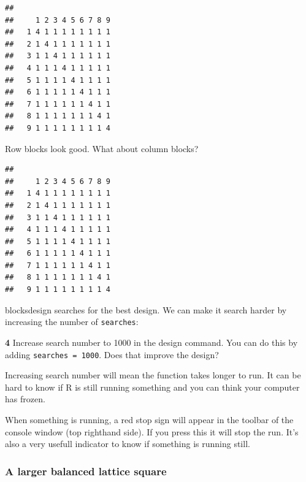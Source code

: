 \documentclass[
]{book}
\makeatletter
\newenvironment{Shaded}{\begin{snugshade}}{\end{snugshade}}
\newcommand{\FunctionTok}[1]{\textcolor[rgb]{0.00,0.00,0.00}{#1}}
\newcommand{\NormalTok}[1]{#1}
\newcommand{\SpecialCharTok}[1]{\textcolor[rgb]{0.00,0.00,0.00}{#1}}
\newenvironment{kframe}{%
\medskip{}
\setlength{\fboxsep}{.8em}
 \def\at@end@of@kframe{}%
 \ifinner\ifhmode%
  \def\at@end@of@kframe{\end{minipage}}%
  \begin{minipage}{\columnwidth}%
 \fi\fi%
 \def\FrameCommand##1{\hskip\@totalleftmargin \hskip-\fboxsep
 \colorbox{shadecolor}{##1}\hskip-\fboxsep
     \hskip-\linewidth \hskip-\@totalleftmargin \hskip\columnwidth}%
 \MakeFramed {\advance\hsize-\width
   \@totalleftmargin\z@ \linewidth\hsize
   \@setminipage}}%
 {\par\unskip\endMakeFramed%
 \at@end@of@kframe}
\newenvironment{rmdblock}[1]
  {
  \begin{itemize}
  \renewcommand{\labelitemi}{
    \raisebox{-.7\height}[0pt][0pt]{
      {\setkeys{Gin}{width=3em,keepaspectratio}\texttt{[image: images/\#1]}}
    }
  }
  \setlength{\fboxsep}{1em}
  \begin{kframe}
  \item
  }
  {
  \end{kframe}
  \end{itemize}
  }
\newenvironment{rmdnote}
  {\begin{rmdblock}{note}}
  {\end{rmdblock}}
\newenvironment{rmdquiz}
  {\begin{rmdblock}{quiz}}
  {\end{rmdblock}}
\makeatother
\begin{document}
\begin{verbatim}
##    
##     1 2 3 4 5 6 7 8 9
##   1 4 1 1 1 1 1 1 1 1
##   2 1 4 1 1 1 1 1 1 1
##   3 1 1 4 1 1 1 1 1 1
##   4 1 1 1 4 1 1 1 1 1
##   5 1 1 1 1 4 1 1 1 1
##   6 1 1 1 1 1 4 1 1 1
##   7 1 1 1 1 1 1 4 1 1
##   8 1 1 1 1 1 1 1 4 1
##   9 1 1 1 1 1 1 1 1 4
\end{verbatim}

Row blocks look good. What about column blocks?

\begin{Shaded}
\end{Shaded}

\begin{verbatim}
##    
##     1 2 3 4 5 6 7 8 9
##   1 4 1 1 1 1 1 1 1 1
##   2 1 4 1 1 1 1 1 1 1
##   3 1 1 4 1 1 1 1 1 1
##   4 1 1 1 4 1 1 1 1 1
##   5 1 1 1 1 4 1 1 1 1
##   6 1 1 1 1 1 4 1 1 1
##   7 1 1 1 1 1 1 4 1 1
##   8 1 1 1 1 1 1 1 4 1
##   9 1 1 1 1 1 1 1 1 4
\end{verbatim}

blocksdesign searches for the best design. We can make it search harder by increasing the number of \texttt{searches}:

\begin{rmdquiz}
\textbf{4} Increase search number to 1000 in the design command. You can do this by adding \texttt{searches\ =\ 1000}. Does that improve the design?
\end{rmdquiz}

\begin{rmdnote}
Increasing search number will mean the function takes longer to run. It can be hard to know if R is still running something and you can think your computer has frozen.

When something is running, a red stop sign will appear in the toolbar of the console window (top righthand side). If you press this it will stop the run. It's also a very usefull indicator to know if something is running still.
\end{rmdnote}

\hypertarget{a-larger-balanced-lattice-square}{%
\subsubsection{A larger balanced lattice square}\label{a-larger-balanced-lattice-square}}
\end{document}

